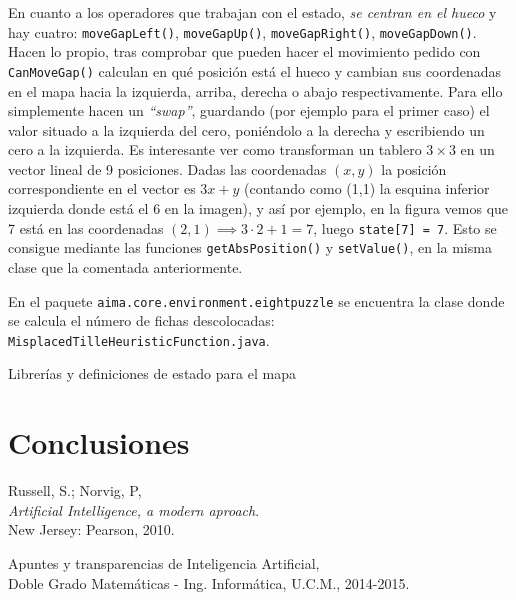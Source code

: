 \documentclass[11pt, a4paper, spanish, openright, twoside]{book}
\begin{document}
En cuanto a los operadores que trabajan con el estado, \textit{se centran en el hueco} y hay cuatro: \texttt{moveGapLeft()}, \texttt{moveGapUp()}, \texttt{moveGapRight()}, \texttt{moveGapDown()}. Hacen lo propio, tras comprobar que pueden hacer el movimiento pedido con \texttt{CanMoveGap()} calculan en qué posición está el hueco y cambian sus coordenadas en el mapa hacia la izquierda, arriba, derecha o abajo respectivamente. Para ello simplemente hacen un \textit{``swap''}, guardando (por ejemplo para el primer caso) el valor situado a la izquierda del cero, poniéndolo a la derecha y escribiendo un cero a la izquierda. Es interesante ver como transforman un tablero $3\times 3$ en un vector lineal de 9 posiciones. Dadas las coordenadas $(x,y)$ la posición correspondiente en el vector es $3x + y$ (contando como (1,1) la esquina inferior izquierda donde está el 6 en la imagen), y así por ejemplo, en la figura vemos que 7 está en las coordenadas $(2,1)\implies 3\cdot 2 + 1 = 7$, luego \texttt{state[7] = 7}. Esto se consigue mediante las funciones \texttt{getAbsPosition()} y \texttt{setValue()}, en la misma clase que la comentada anteriormente.

En el paquete \texttt{aima.core.environment.eightpuzzle} se encuentra la clase donde se calcula el número de fichas descolocadas: \texttt{MisplacedTilleHeuristicFunction.java}.



\begin{section}{Librerías y definiciones de estado para el mapa }


\end{section}

	
\section{Conclusiones}


	
\begin{thebibliography}{9}

	Russell, S.; Norvig, P, \\
	\emph{Artificial Intelligence, a modern aproach}.\\
	New Jersey: Pearson, 2010.
	
	Apuntes y transparencias de Inteligencia Artificial, \\
	Doble Grado Matemáticas - Ing. Informática, U.C.M., 2014-2015.

\end{thebibliography}
\end{document}
